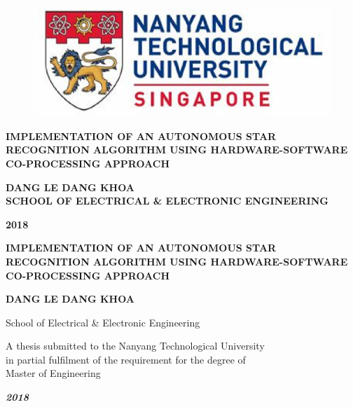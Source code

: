 \documentclass[dvips,a4paper,12pt]{report}
\begin{document}
	\thispagestyle{empty}
	\begin{center}
		
		\begin{figure}
			\centering
			\vspace{2mm}
			\includegraphics[scale=0.6]{images/NTU_logo.eps}
				\label{fig:NTU_Logo}
		\end{figure}

		\vspace{\fill}

		\textbf{\Large \MakeUppercase{IMPLEMENTATION OF AN AUTONOMOUS STAR RECOGNITION ALGORITHM USING HARDWARE-SOFTWARE CO-PROCESSING APPROACH}}
		
		\vspace{\fill}
		
		\textbf{\MakeUppercase{DANG LE DANG KHOA}} \\

		\textbf{SCHOOL OF ELECTRICAL \& ELECTRONIC ENGINEERING}
		
		\textbf{2018}
		
	\end{center}
	
	\newpage
	\thispagestyle{empty}
	\begin{center}
		\vspace{4.0cm}

		\renewcommand{\baselinestretch}{1.0}%
			\textbf{\Large \MakeUppercase{IMPLEMENTATION OF AN AUTONOMOUS STAR RECOGNITION ALGORITHM USING HARDWARE-SOFTWARE CO-PROCESSING APPROACH}}
		\renewcommand{\baselinestretch}{\spacing}%

		\vspace{\fill}

		\textbf{\MakeUppercase{DANG LE DANG KHOA}} \\

		\vspace{\fill}

		{School of Electrical \& Electronic Engineering}

		\vspace{2.0cm}

		A thesis submitted to the Nanyang Technological University \\
		in partial fulfilment of the requirement for the degree of \\
		Master of Engineering

		\vspace{2.0cm}
		
		{\textbf{\emph{2018}}}

	\end{center}
\end{document}
